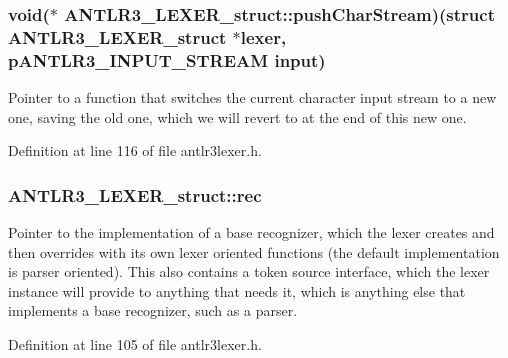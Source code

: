 \hypertarget{struct_a_n_t_l_r3___l_e_x_e_r__struct_afa7cff0e582050f15c7c27e17a2e844c}{
\subsubsection[{push\-Char\-Stream}]{\setlength{\rightskip}{0pt plus 5cm}void($\ast$ A\-N\-T\-L\-R3\-\_\-\-L\-E\-X\-E\-R\-\_\-struct\-::push\-Char\-Stream)(struct {\bf A\-N\-T\-L\-R3\-\_\-\-L\-E\-X\-E\-R\-\_\-struct} $\ast$lexer, {\bf p\-A\-N\-T\-L\-R3\-\_\-\-I\-N\-P\-U\-T\-\_\-\-S\-T\-R\-E\-A\-M} {\bf input})}}\label{struct_a_n_t_l_r3___l_e_x_e_r__struct_afa7cff0e582050f15c7c27e17a2e844c}
Pointer to a function that switches the current character input stream to a new one, saving the old one, which we will revert to at the end of this new one. 

Definition at line 116 of file antlr3lexer.\-h.

\hypertarget{struct_a_n_t_l_r3___l_e_x_e_r__struct_afcb0d60a4a2c829c30cc1e8e3454390f}{
\subsubsection[{rec}]{ A\-N\-T\-L\-R3\-\_\-\-L\-E\-X\-E\-R\-\_\-struct\-::rec}}\label{struct_a_n_t_l_r3___l_e_x_e_r__struct_afcb0d60a4a2c829c30cc1e8e3454390f}
Pointer to the implementation of a base recognizer, which the lexer creates and then overrides with its own lexer oriented functions (the default implementation is parser oriented). This also contains a token source interface, which the lexer instance will provide to anything that needs it, which is anything else that implements a base recognizer, such as a parser. 

Definition at line 105 of file antlr3lexer.\-h.

